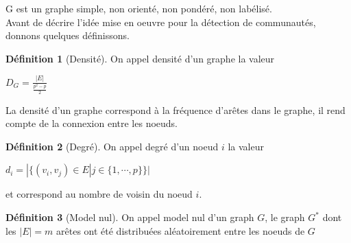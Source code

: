 \documentclass[frenchb]{report}
\newcommand{\1}{\mathbbm{1}}
\theoremstyle{definition}\newtheorem{defn}{Définition}
\theoremstyle{definition}\newtheorem{exm}{Exemple}
\theoremstyle{definition}\newtheorem{nota}{Notation}
\theoremstyle{definition}\newtheorem{rem}{Remarque}
\begin{document}
G est un graphe simple, non orienté, non pondéré, non labélisé.\\

Avant de décrire l'idée mise en oeuvre pour la détection de communautés, donnons quelques définissons.\\

\begin{defn}[Densité]
On appel densité d'un graphe la valeur 
\begin{center}
$D_G = \frac{|E|}{\frac{p^2-p}{2}} $
\end{center}
\end{defn}

La densité d'un graphe correspond à la fréquence d'arêtes dans le graphe, il rend compte de la connexion entre les noeuds.

\begin{defn}[Degré]
On appel degré d'un noeud $i$ la valeur 
\begin{center}
$d_i = |\{(v_i,v_j) \in E | j \in {\{1,\cdots,p\}} \}| $
\end{center}
\end{defn}
et correspond au nombre de voisin du noeud $i$.\\

\begin{defn}[Model nul]
On appel model nul d'un graph $G$, le graph $G^*$ dont les $|E| = m$ arêtes ont été distribuées aléatoirement entre les noeuds de $G$
\end{defn}
\end{document}
